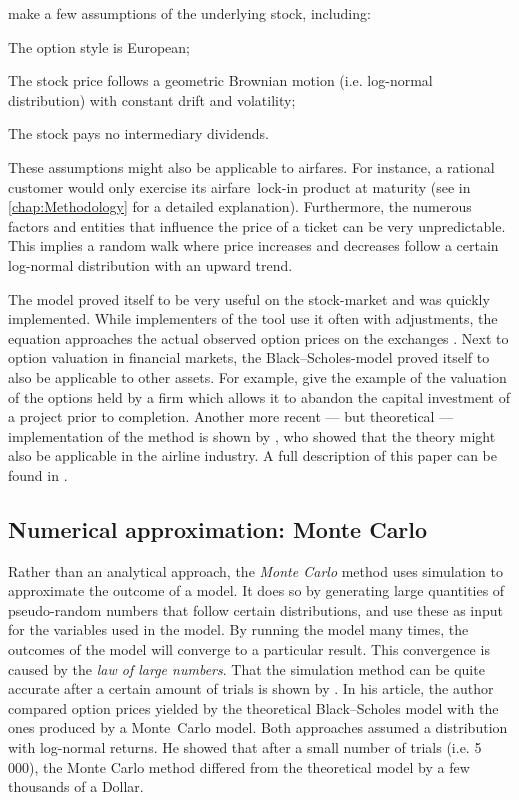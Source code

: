 \noindent
{} make a few assumptions of the underlying stock, including:
\begin{compactitem}
\item The option style is European;
\item The stock price follows a geometric Brownian motion (i.e. log-normal distribution) with constant drift and volatility;
\item The stock pays no intermediary dividends.
\end{compactitem}

\noindent
These assumptions might also be applicable to airfares. For instance, a rational customer would only exercise its airfare~lock-in product at maturity (see  in \cref{chap:Methodology} for a detailed explanation). Furthermore, the numerous factors and entities that influence the price of a ticket can be very unpredictable. This implies a random walk where price increases and decreases follow a certain log-normal distribution with an upward trend.

The model proved itself to be very useful on the stock-market and was quickly implemented. While implementers of the tool use it often with adjustments, the equation approaches the actual observed option prices on the exchanges \cite{bodie2008investments}.
Next to option valuation in financial markets, the Black--Scholes-model proved itself to also be applicable to other assets. For example,  give the example of the valuation of the options held by a firm which allows it to abandon the capital investment of a project prior to completion. Another more recent --- but theoretical --- implementation of the method is shown by , who showed that the theory might also be applicable in the airline industry. A full description of this paper can be found in .


\subsection{Numerical approximation: Monte Carlo}
Rather than an analytical approach, the \emph{Monte Carlo} method uses simulation to approximate the outcome of a model. It does so by generating large quantities of pseudo-random numbers that follow certain distributions, and use these as input for the variables used in the model.  By running the model many times, the outcomes of the model will converge to a particular result. This convergence is caused by the \emph{law of large numbers}. That the simulation method can be quite accurate after a certain amount of trials is shown by . In his article, the author compared option prices yielded by the theoretical Black--Scholes model with the ones produced by a Monte~Carlo model. Both approaches assumed a distribution with log-normal returns. He showed that after a small number of trials (i.e. 5\,000), the Monte Carlo method differed from the theoretical model by a few thousands of a Dollar.

